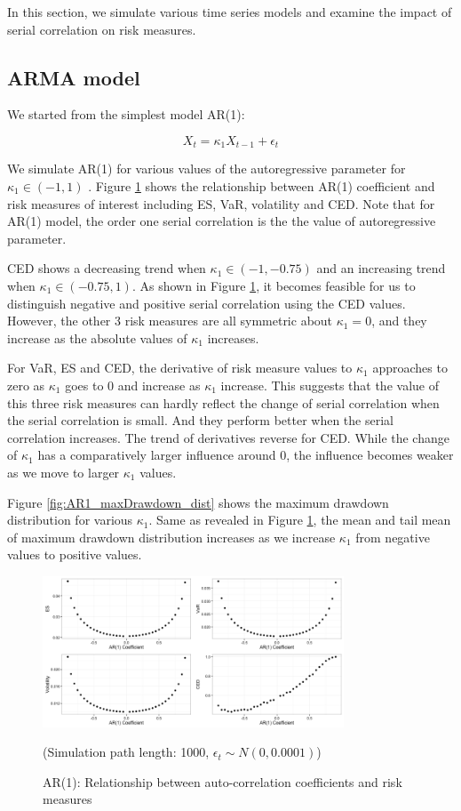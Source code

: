 \documentclass[11pt]{article}
\begin{document}
In this section, we simulate various time series models and examine the impact of serial correlation on risk measures.

\subsection{ARMA model}

We started from the simplest model AR(1):

\begin{equation}
X_t = \kappa_1X_{t-1} + \epsilon_t
\end{equation}

We simulate AR(1) for various values of the autoregressive parameter for $\kappa_1 \in (-1, 1)$ . Figure \ref{fig:AR1_risk_measures} shows the relationship between AR(1) coefficient and risk measures of interest including ES, VaR, volatility and CED. Note that for AR(1) model, the order one serial correlation is the the value of autoregressive parameter.

CED shows a decreasing trend when $\kappa_1\in(-1, -0.75)$ and an increasing trend when $\kappa_1 \in(-0.75, 1)$. As shown in Figure \ref{fig:AR1_risk_measures}, it becomes feasible for us to distinguish negative and positive serial correlation using the CED values. However, the other 3 risk measures are all symmetric about $\kappa_1 = 0$, and they increase as the absolute values of $\kappa_1$ increases.

For VaR, ES and CED, the derivative of risk measure values to $\kappa_1$ approaches to zero as  $\kappa_1$ goes to 0 and increase as $\kappa_1$ increase. This suggests that the value of this three risk measures can hardly reflect the change of serial correlation when the serial correlation is small. And they perform better when the serial correlation increases. The trend of derivatives reverse for CED. While the change of $\kappa_1$ has a comparatively larger influence around 0, the influence becomes weaker as we move to larger  $\kappa_1$ values.

Figure \ref{fig:AR1_maxDrawdown_dist} shows the maximum drawdown distribution for various $\kappa_1$. Same as revealed in Figure \ref{fig:AR1_risk_measures}, the mean and tail mean of maximum drawdown distribution increases as we increase $\kappa_1$ from negative values to positive values.

\begin{figure}[H]
\centering
\includegraphics[width = 0.8\textwidth]{../figures/simulation/AR1_risk_measures}
\caption{AR(1): Relationship between auto-correlation coefficients and risk measures}
(Simulation path length: 1000, $\epsilon_t \sim N(0, 0.0001)$)
\label{fig:AR1_risk_measures}
\end{figure}
\end{document}
